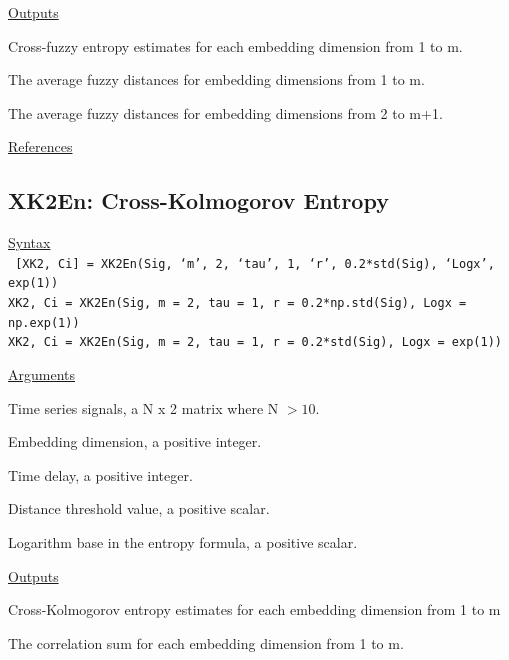 \documentclass[12pt, a4paper, titlepage, openany]{book}
\begin{document}
\noindent \ul{Outputs}
\begin{description}[labelsep=1cm, labelwidth=2cm, nosep]\footnotesize
\item[\texttt{XFuzz}]	Cross-fuzzy entropy estimates for each embedding dimension from 1 to m.
\item[\texttt{Ps1}]		The average fuzzy distances for embedding dimensions from 1 to m.
\item[\texttt{Ps2}]		The average fuzzy distances for embedding dimensions from 2 to m+1.
\end{description}

\noindent \ul{References}\hspace{1cm}
\cite{XFuzz1}



\newpage
\subsection{\normalsize XK2En: \hspace{15mm}  Cross-Kolmogorov Entropy}
\noindent\ul{Syntax} \vspace{6mm} \\ \noindent \texttt{\footnotesize
[XK2, Ci] = XK2En(Sig, ‘m’, 2, ‘tau’, 1, ‘r’, 0.2*std(Sig), ‘Logx’, exp(1)) \\
XK2, Ci  = XK2En(Sig, m = 2, tau = 1, r = 0.2*np.std(Sig), Logx = np.exp(1)) \\
XK2, Ci  = XK2En(Sig, m = 2, tau = 1, r = 0.2*std(Sig), Logx = exp(1))}

\noindent \ul{Arguments}
\begin{description}[labelsep=1cm, labelwidth=2cm, nosep, style=multiline,leftmargin=3cm]\footnotesize
\item[\texttt{Sig}]		Time series signals, a N x 2 matrix where N $> 10$.
\item[\texttt{m}]		Embedding dimension, a positive integer.
\item[\texttt{tau}]		Time delay, a positive integer.
\item[\texttt{r}]		Distance threshold value, a positive scalar.
\item[\texttt{Logx}]	Logarithm base in the entropy formula, a positive scalar.
\end{description}

\noindent \ul{Outputs}
\begin{description}[labelsep=1cm, labelwidth=2cm, nosep, style=multiline,leftmargin=3cm]\footnotesize
\item[\texttt{XK2}]		Cross-Kolmogorov entropy estimates for each embedding dimension from 1 to m
\item[\texttt{Ci}]		The correlation sum for each embedding dimension from 1 to m.
\end{description}
\end{document}
